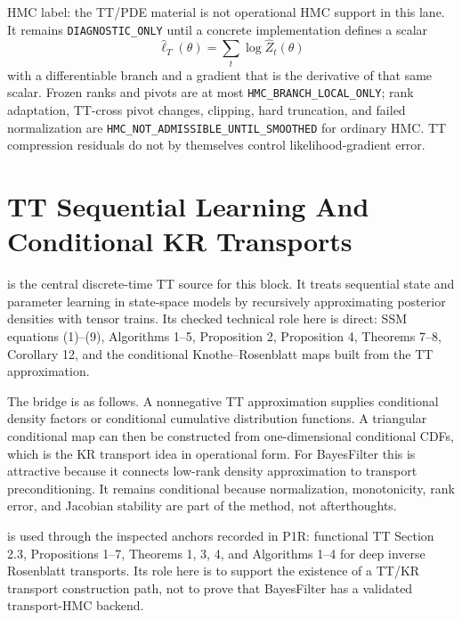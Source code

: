 HMC label: the TT/PDE material is not operational HMC support in this lane.
It remains \texttt{DIAGNOSTIC\_ONLY} until a concrete implementation defines a
scalar
\[
  \widehat\ell_T(\theta)=\sum_t\log\widehat Z_t(\theta)
\]
with a differentiable branch and a gradient that is the derivative of that
same scalar.  Frozen ranks and pivots are at most
\texttt{HMC\_BRANCH\_LOCAL\_ONLY}; rank adaptation, TT-cross pivot changes,
clipping, hard truncation, and failed normalization are
\texttt{HMC\_NOT\_ADMISSIBLE\_UNTIL\_SMOOTHED} for ordinary HMC.  TT compression
residuals do not by themselves control likelihood-gradient error.

\section{TT Sequential Learning And Conditional KR Transports}
\label{sec:bf-hd-zhao-cui}

\citet{zhao2024ttsequential} is the central discrete-time TT source for this
block.  It treats sequential state and parameter learning in state-space models
by recursively approximating posterior densities with tensor trains.  Its
checked technical role here is direct: SSM equations (1)--(9), Algorithms
1--5, Proposition 2, Proposition 4, Theorems 7--8, Corollary 12, and the
conditional Knothe--Rosenblatt maps built from the TT approximation.

The bridge is as follows.  A nonnegative TT approximation supplies conditional
density factors or conditional cumulative distribution functions.  A
triangular conditional map can then be constructed from one-dimensional
conditional CDFs, which is the KR transport idea in operational form.  For
BayesFilter this is attractive because it connects low-rank density
approximation to transport preconditioning.  It remains conditional because
normalization, monotonicity, rank error, and Jacobian stability are part of the
method, not afterthoughts.

\citet{cui2021deep} is used through the inspected anchors recorded in P1R:
functional TT Section 2.3, Propositions 1--7, Theorems 1, 3, 4, and Algorithms
1--4 for deep inverse Rosenblatt transports.  Its role here is to support the
existence of a TT/KR transport construction path, not to prove that BayesFilter
has a validated transport-HMC backend.

